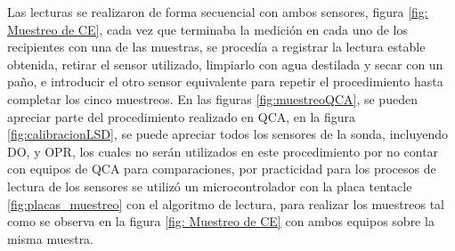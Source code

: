 Las lecturas se realizaron de forma secuencial con ambos sensores, figura \ref{fig: Muestreo de CE}, cada vez que terminaba la medición  en cada uno de los recipientes con una de las muestras, se proced\'ia a registrar la lectura estable obtenida, retirar el sensor utilizado, limpiarlo con agua destilada y secar con un pa\~no, e introducir el otro sensor equivalente para repetir el procedimiento hasta completar los cinco muestreos.
En las figuras \ref{fig:muestreoQCA}, se pueden apreciar parte del procedimiento realizado en QCA, en la figura \ref{fig:calibracionLSD}, se puede apreciar todos los sensores de la sonda, incluyendo DO, y OPR, los cuales no serán utilizados en este procedimiento por no contar con equipos de QCA para comparaciones, por practicidad para los procesos de lectura de los sensores se utilizó un microcontrolador con la placa tentacle \ref{fig:placas_muestreo} con el algoritmo de lectura, para realizar los muestreos tal como se observa en la figura \ref{fig: Muestreo de CE} con ambos equipos sobre la misma muestra.
